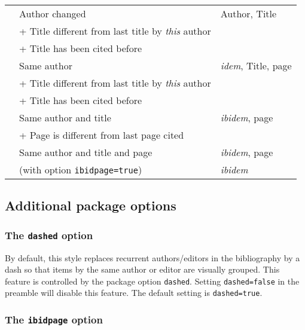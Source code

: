 \documentclass[a4paper]{article}
\newenvironment*{inlinetable}
  {\trivlist\footnotesize\item}
  {\endtrivlist}
\newcommand*{\code}[1]{%
  \detokenize\expandafter{\string#1}}
\begin{document}
\begin{inlinetable}
\begin{tabularx}{\linewidth}{@{}VlX@{}}
\cmidrule(r){1-1}\cmidrule(lr){2-2}\cmidrule(l){3-3}
\code{\cite{a1}}        & Author changed        & Author, Title \\
                        & + Title different from last title by \emph{this} author \\
                        & + Title has been cited before \\
\cmidrule(r){1-1}\cmidrule(lr){2-2}\cmidrule(l){3-3}
\code{\cite[55]{a2}}    & Same author           & \emph{idem}, Title, page \\
                        & + Title different from last title by \emph{this} author \\
                        & + Title has been cited before \\
\cmidrule(r){1-1}\cmidrule(lr){2-2}\cmidrule(l){3-3}
\code{\cite[25]{a2}}    & Same author and title & \emph{ibidem}, page \\
                        & + Page is different from last page cited \\
\cmidrule(r){1-1}\cmidrule(lr){2-2}\cmidrule(l){3-3}
\code{\cite[25]{a2}}    & Same author and title and page
						& \emph{ibidem}, page \\
\code{\cite[25]{a2}}    & (with option \texttt{ibidpage=true})
						& \emph{ibidem} \\
\bottomrule
\end{tabularx}
\end{inlinetable}

\clearpage

\subsection*{Additional package options}

\subsubsection*{The \texttt{dashed} option}

By default, this style replaces recurrent authors/editors in the
bibliography by a dash so that items by the same author or editor
are visually grouped. This feature is controlled by the package
option \texttt{dashed}. Setting \texttt{dashed=false} in the
preamble will disable this feature. The default setting is
\texttt{dashed=true}.

\subsubsection*{The \texttt{ibidpage} option}
\end{document}
